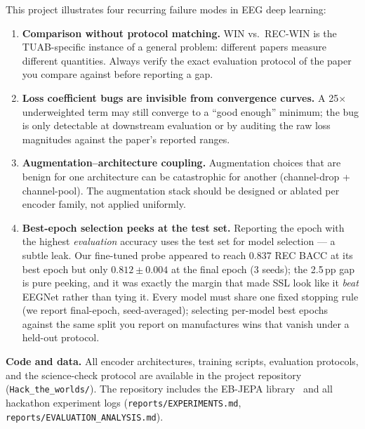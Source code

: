 \documentclass[11pt,a4paper]{article}
\begin{document}
This project illustrates four recurring failure modes in EEG deep learning:
\begin{enumerate}[noitemsep]
  \item \textbf{Comparison without protocol matching.}
    WIN vs.\ REC-WIN is the TUAB-specific instance of a general problem:
    different papers measure different quantities.  Always verify the exact
    evaluation protocol of the paper you compare against before reporting a gap.

  \item \textbf{Loss coefficient bugs are invisible from convergence curves.}
    A 25$\times$ underweighted term may still converge to a ``good enough''
    minimum; the bug is only detectable at downstream evaluation or by auditing
    the raw loss magnitudes against the paper's reported ranges.

  \item \textbf{Augmentation--architecture coupling.}
    Augmentation choices that are benign for one architecture can be
    catastrophic for another (channel-drop + channel-pool).
    The augmentation stack should be designed or ablated per encoder family,
    not applied uniformly.
  \item \textbf{Best-epoch selection peeks at the test set.}
    Reporting the epoch with the highest \emph{evaluation} accuracy uses the
    test set for model selection --- a subtle leak.  Our fine-tuned probe
    appeared to reach 0.837 REC BACC at its best epoch but only
    $0.812 \pm 0.004$ at the final epoch (3 seeds); the 2.5\,pp gap is pure
    peeking, and it was exactly the margin that made SSL look like it
    \emph{beat} EEGNet rather than tying it.  Every model must share one fixed
    stopping rule (we report final-epoch, seed-averaged); selecting per-model
    best epochs against the same split you report on manufactures wins that
    vanish under a held-out protocol.
\end{enumerate}

\bigskip
\noindent\textbf{Code and data.}
All encoder architectures, training scripts, evaluation protocols, and the
science-check protocol are available in the project repository
(\texttt{Hack\_the\_worlds/}).
The repository includes the EB-JEPA library~\cite{ebjepa_lib} and all hackathon
experiment logs (\texttt{reports/EXPERIMENTS.md},
\texttt{reports/EVALUATION\_ANALYSIS.md}).



\end{document}
